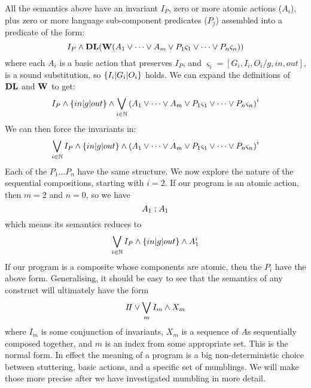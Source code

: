 All the semantics above have an invariant $I_P$,
zero or more atomic actions ($A_i$),
plus zero or more language sub-component predicates ($P_j$)
assembled into a predicate of the form:
\[
  I_P
  \land
  \mathbf{DL}(\mathbf{W}( A_1 \lor \dots \lor A_m
     \lor
     P_1\varsigma_1 \lor \dots \lor P_n\varsigma_n ))
\]
where each $A_i$ is a basic action that preserves $I_P$,
and $\varsigma_i = [G_i,I_i,O_i/g,in,out]$,
is a sound substitution, so $\{I_i|G_i|O_i\}$ holds.
We can expand the definitions of $\mathbf{DL}$ and $\mathbf{W}$ to get:
\[
  I_P \land \{in|g|out\}
  \land
  \bigvee_{i \in \mathbb{N}}
    \left( A_1 \lor \dots \lor A_m
          \lor
          P_1\varsigma_1 \lor \dots \lor P_n\varsigma_n
    \right)^i
\]
We can then force the invariants in:
\[
    \bigvee_{i \in \mathbb{N}}
      I_P \land \{in|g|out\}
      \land
       \left( A_1 \lor \dots \lor A_m
             \lor
             P_1\varsigma_1 \lor \dots \lor P_n\varsigma_n
       \right)^i
\]
Each of the $P_1 \dots P_n$ have the same structure.
We now explore the nature of the sequential compositions,
starting with $i=2$.
If our program is an atomic action, then $m=2$ and $n=0$, so
we have
\[
  A_1 \mathrel{;} A_1
\]
which means its semantics reduces to
\[
 \bigvee_{i \in \mathbb{N} }I_P \land \{in|g|out\} \land A_1^i
\]
If our program is a composite whose components are atomic,
then the $P_i$ have the above form.
Generalising, it should be easy to see that the semantics of any construct
will ultimately have the form
\[
  I\!I \lor \bigvee_m  I_m \land X_m
\]
where $I_m$ is some conjunction of invariants,
$X_m$ is a sequence of $A$s sequentially composed together,
and $m$ is an index from some appropriate set.
This is the normal form.
In effect the meaning of a program is a big non-deterministic choice
between stuttering, basic actions,
and a specific set of mumblings.
We will make those more precise after we have investigated mumbling in more detail.

